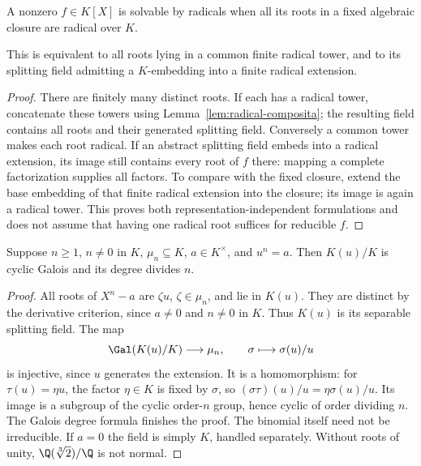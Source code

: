 \begin{definition}
A nonzero $f\in K[X]$ is solvable by radicals when all its roots in a fixed algebraic closure are radical over $K$.
\end{definition}
\begin{proposition}
This is equivalent to all roots lying in a common finite radical tower, and to its splitting field admitting a $K$-embedding into a finite radical extension.
\end{proposition}
\begin{proof}
There are finitely many distinct roots. If each has a radical tower, concatenate these towers using Lemma~\ref{lem:radical-composita}; the resulting field contains all roots and their generated splitting field. Conversely a common tower makes each root radical. If an abstract splitting field embeds into a radical extension, its image still contains every root of $f$ there: mapping a complete factorization supplies all factors. To compare with the fixed closure, extend the base embedding of that finite radical extension into the closure; its image is again a radical tower. This proves both representation-independent formulations and does not assume that having one radical root suffices for reducible $f$.
\end{proof}

\begin{theorem}
Suppose $n\geq1$, $n\ne0$ in $K$, $\mu_n\subseteq K$, $a\in K^\times$, and $u^n=a$. Then $K(u)/K$ is cyclic Galois and its degree divides $n$.
\end{theorem}
\begin{proof}
All roots of $X^n-a$ are $\zeta u$, $\zeta\in\mu_n$, and lie in $K(u)$. They are distinct by the derivative criterion, since $a\ne0$ and $n\ne0$ in $K$. Thus $K(u)$ is its separable splitting field. The map
\[\Gal(K(u)/K)\longrightarrow\mu_n,\qquad\sigma\longmapsto\sigma(u)/u
\]
is injective, since $u$ generates the extension. It is a homomorphism: for $\tau(u)=\eta u$, the factor $\eta\in K$ is fixed by $\sigma$, so $(\sigma\tau)(u)/u=\eta\sigma(u)/u$. Its image is a subgroup of the cyclic order-$n$ group, hence cyclic of order dividing $n$. The Galois degree formula finishes the proof. The binomial itself need not be irreducible. If $a=0$ the field is simply $K$, handled separately. Without roots of unity, $\Q(\sqrt[3]{2})/\Q$ is not normal.
\end{proof}


